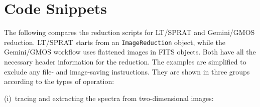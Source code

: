 \documentclass[linenumbers, twocolumn]{aastex631}
\begin{document}


\appendix
\section{Code Snippets}
\label{sec:appendix}
The following compares the reduction scripts for LT/SPRAT and
Gemini/GMOS reduction. LT/SPRAT starts from an \texttt{ImageReduction} object,
while the Gemini/GMOS workflow uses flattened images in FITS objects.
Both have all the necessary header information for the reduction.
The examples are simplified to exclude any file- and image-saving
instructions. They are shown in three groups according to the types
of operation:

(i)~tracing and extracting the spectra from two-dimensional images:
\end{document}
